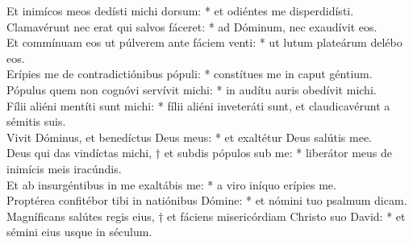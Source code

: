 {	Et inimícos meos dedísti michi dorsum: * et odiéntes me disperdidísti. \\
	Clamavérunt nec erat qui salvos fáceret: * ad Dóminum, nec exaudívit eos. \\
	Et commínuam eos ut púlverem ante fáciem venti: * ut lutum plateárum delébo eos. \\
	Erípies me de contradictiónibus pópuli: * constítues me in caput géntium. \\
	Pópulus quem non cognóvi servívit michi: * in audítu auris obedívit michi. \\
	Fílii aliéni mentíti sunt michi: * fílii aliéni inveteráti sunt, et claudicavérunt a sémitis suis. \\
	Vivit Dóminus, et benedíctus Deus meus: * et exaltétur Deus salútis mee. \\
	Deus qui das vindíctas michi, † et subdis pópulos sub me: * liberátor meus de inimícis meis iracúndis. \\
	Et ab insurgéntibus in me exaltábis me: * a viro iníquo erípies me. \\
	Proptérea confitébor tibi in natiónibus Dómine: * et nómini tuo psalmum dicam. \\
	Magníficans salútes regis eius, † et fáciens misericórdiam Christo suo David: * et sémini eius usque in séculum.
}

